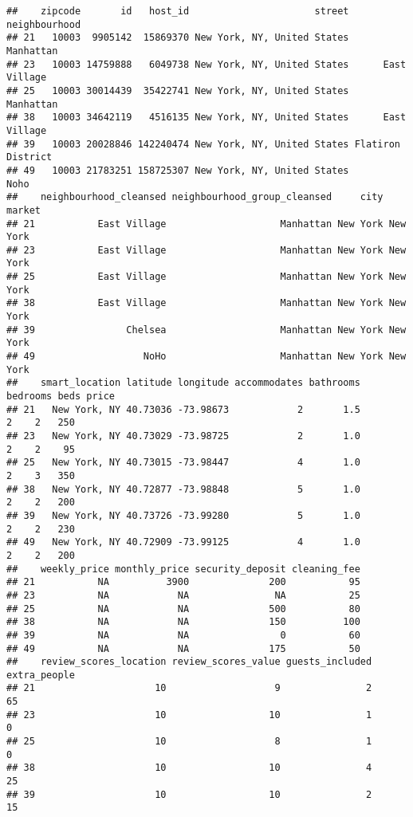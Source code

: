\documentclass[
]{article}
\begin{document}
\begin{verbatim}
##    zipcode       id   host_id                      street     neighbourhood
## 21   10003  9905142  15869370 New York, NY, United States         Manhattan
## 23   10003 14759888   6049738 New York, NY, United States      East Village
## 25   10003 30014439  35422741 New York, NY, United States         Manhattan
## 38   10003 34642119   4516135 New York, NY, United States      East Village
## 39   10003 20028846 142240474 New York, NY, United States Flatiron District
## 49   10003 21783251 158725307 New York, NY, United States              Noho
##    neighbourhood_cleansed neighbourhood_group_cleansed     city   market
## 21           East Village                    Manhattan New York New York
## 23           East Village                    Manhattan New York New York
## 25           East Village                    Manhattan New York New York
## 38           East Village                    Manhattan New York New York
## 39                Chelsea                    Manhattan New York New York
## 49                   NoHo                    Manhattan New York New York
##    smart_location latitude longitude accommodates bathrooms bedrooms beds price
## 21   New York, NY 40.73036 -73.98673            2       1.5        2    2   250
## 23   New York, NY 40.73029 -73.98725            2       1.0        2    2    95
## 25   New York, NY 40.73015 -73.98447            4       1.0        2    3   350
## 38   New York, NY 40.72877 -73.98848            5       1.0        2    2   200
## 39   New York, NY 40.73726 -73.99280            5       1.0        2    2   230
## 49   New York, NY 40.72909 -73.99125            4       1.0        2    2   200
##    weekly_price monthly_price security_deposit cleaning_fee
## 21           NA          3900              200           95
## 23           NA            NA               NA           25
## 25           NA            NA              500           80
## 38           NA            NA              150          100
## 39           NA            NA                0           60
## 49           NA            NA              175           50
##    review_scores_location review_scores_value guests_included extra_people
## 21                     10                   9               2           65
## 23                     10                  10               1            0
## 25                     10                   8               1            0
## 38                     10                  10               4           25
## 39                     10                  10               2           15

\end{verbatim}
\end{document}
